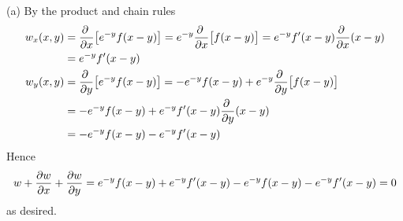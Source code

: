 \begin{solution}
(a) By the product and chain rules
\begin{align*}
w_x(x,y) 
   &= \pdiff{}{x}\big[e^{-y}f(x-y)\big]
    = e^{-y} \pdiff{}{x}\big[f(x-y)\big]
    = e^{-y} f'(x-y)\pdiff{}{x}(x-y) \\
   &= e^{-y}f'(x-y) 
\\%
w_y(x,y) &= \pdiff{}{y}\big[e^{-y}f(x-y)\big]
    = -e^{-y}f(x-y) + e^{-y} \pdiff{}{y}\big[f(x-y)\big] \\
   &= -e^{-y}f(x-y) + e^{-y} f'(x-y)\pdiff{}{y}(x-y) \\
   &= -e^{-y}f(x-y)-e^{-y}f'(x-y)
\end{align*}
Hence
\begin{equation*}
w+\pdiff{w}{x}+\pdiff{w}{y}
=e^{-y}f(x-y)+e^{-y}f'(x-y)-e^{-y}f(x-y)-e^{-y}f'(x-y)
=0
\end{equation*}
as desired.


\end{solution}
